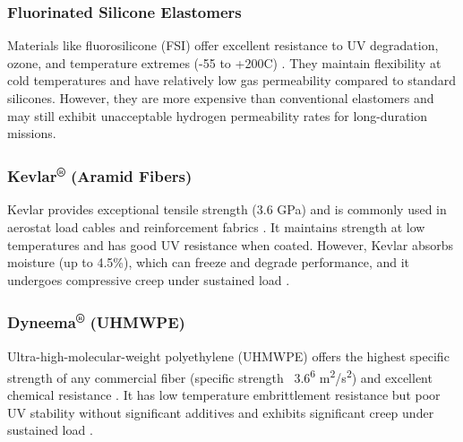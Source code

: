 \documentclass[12pt]{article}
\begin{document}
\subsubsection{Fluorinated Silicone Elastomers}
Materials like fluorosilicone (FSI) offer excellent resistance to UV degradation, ozone, and temperature extremes (-55 to +200\textdegree{}C) \cite{rouse2013}. They maintain flexibility at cold temperatures and have relatively low gas permeability compared to standard silicones. However, they are more expensive than conventional elastomers and may still exhibit unacceptable hydrogen permeability rates for long-duration missions.

\subsubsection{Kevlar\textsuperscript{®} (Aramid Fibers)}
Kevlar provides exceptional tensile strength (3.6 GPa) and is commonly used in aerostat load cables and reinforcement fabrics \cite{morgan2005}. It maintains strength at low temperatures and has good UV resistance when coated. However, Kevlar absorbs moisture (up to 4.5\%), which can freeze and degrade performance, and it undergoes compressive creep under sustained load \cite{morga2001}.

\subsubsection{Dyneema\textsuperscript{®} (UHMWPE)}
Ultra-high-molecular-weight polyethylene (UHMWPE) offers the highest specific strength of any commercial fiber (specific strength ~3.6\textsuperscript{6} m\textsuperscript{2}/s\textsuperscript{2}) and excellent chemical resistance \cite{gouella2008}. It has low temperature embrittlement resistance but poor UV stability without significant additives and exhibits significant creep under sustained load \cite{white2014}.
\end{document}
